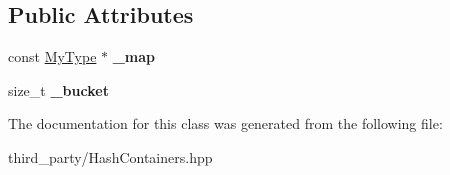 \subsection*{Public Attributes}
\begin{DoxyCompactItemize}
\item 
\hypertarget{classemlib_1_1_hash_map_1_1const__iterator_aa763cf9cab329732a92f25af5617d540}{const \hyperlink{classemlib_1_1_hash_map}{My\+Type} $\ast$ {\bfseries \+\_\+map}}\label{classemlib_1_1_hash_map_1_1const__iterator_aa763cf9cab329732a92f25af5617d540}

\item 
\hypertarget{classemlib_1_1_hash_map_1_1const__iterator_a4ff5de52aaea0a1907a88c5c2d32f13d}{size\+\_\+t {\bfseries \+\_\+bucket}}\label{classemlib_1_1_hash_map_1_1const__iterator_a4ff5de52aaea0a1907a88c5c2d32f13d}

\end{DoxyCompactItemize}


The documentation for this class was generated from the following file\+:\begin{DoxyCompactItemize}
\item 
third\+\_\+party/Hash\+Containers.\+hpp\end{DoxyCompactItemize}
